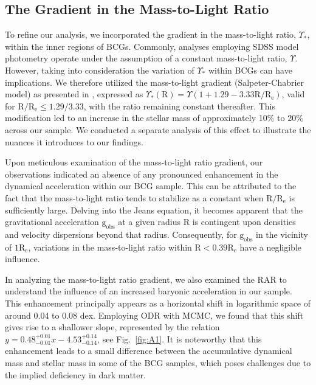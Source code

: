 \documentclass[a4paper, two-column, twocolappendix]{aa}
\newcommand{\percent}{\ensuremath{\%}}
\newcommand{\gobs}{\mathrm{g}_\mathrm{obs}}
\begin{document}
\clearpage
\begin{appendix}
\FloatBarrier
\section{The Gradient in the Mass-to-Light Ratio}\label{appendix:A}
To refine our analysis, we incorporated the gradient in the mass-to-light ratio, $\Upsilon_{*}$, 
 within the inner regions of BCGs. Commonly, analyses employing SDSS model photometry operate under the assumption of a constant mass-to-light ratio, $\Upsilon$. 
However, taking into consideration the variation of $\Upsilon_{*}$ within BCGs can have implications. 
We therefore utilized the mass-to-light gradient (Salpeter-Chabrier model) as presented in \cite{Bernardi18}, 
 expressed as $\Upsilon_{*}(\mathrm{R}) = \Upsilon(1+1.29-3.33\mathrm{R}/\mathrm{R}_\mathrm{e})$,
 valid for $\mathrm{R}/\mathrm{R}_\mathrm{e}\leq1.29/3.33$, with the ratio remaining constant thereafter. 
This modification led to an increase in the stellar mass of approximately 10$\percent$ to 20$\percent$ across our sample. 
We conducted a separate analysis of this effect to illustrate the nuances it introduces to our findings.

Upon meticulous examination of the mass-to-light ratio gradient, our observations indicated an absence of any pronounced enhancement in the dynamical acceleration within our BCG sample. This can be attributed to the fact that the mass-to-light ratio tends to stabilize as a constant when $\mathrm{R}/\mathrm{R}_\mathrm{e}$ is sufficiently large. Delving into the Jeans equation, it becomes apparent that the gravitational acceleration $\gobs$ at a given radius $\mathrm{R}$ is contingent upon densities and velocity dispersions beyond that radius. Consequently, for $\gobs$ in the vicinity of $1\mathrm{R}_\mathrm{e}$, variations in the mass-to-light ratio within $\mathrm{R}<0.39\mathrm{R}_\mathrm{e}$ have a negligible influence.

In analyzing the mass-to-light ratio gradient, 
 we also examined the RAR to understand the influence of an increased baryonic acceleration in our sample. 
This enhancement principally appears as a horizontal shift in logarithmic space of around 0.04 to 0.08 dex. 
Employing ODR with MCMC, we found that this shift gives rise to a shallower slope, 
 represented by the relation $y = 0.48^{+0.01}_{-0.01}x - 4.53^{+0.14}_{-0.14}$, see Fig.~\ref{fig:A1}.
It is noteworthy that this enhancement leads to a small difference between the accumulative dynamical mass and stellar mass in some of the BCG samples, which poses challenges due to the implied deficiency in dark matter.



\end{appendix}
\end{document}
